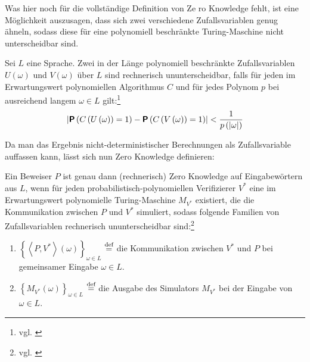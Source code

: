 Was hier noch für die vollständige Definition von Ze ro Knowledge fehlt, ist eine Möglichkeit auszusagen, dass sich zwei verschiedene Zufallsvariablen genug ähneln, sodass diese für eine polynomiell beschränkte Turing-Maschine nicht unterscheidbar sind.

\vspace{0.2cm}

\begin{definition} Sei \( L \) eine Sprache.
Zwei in der Länge polynomiell beschränkte Zufallsvariablen \( U \left( \omega \right) \) und \( V \left( \omega \right) \) über \( L \) sind rechnerisch ununterscheidbar, falls für jeden im Erwartungswert polynomiellen Algorithmus \( C \) und für jedes Polynom \( p \) bei ausreichend langem \( \omega \in L \) gilt:\footnote{vgl. \cite[Seite 93]{goldwasser1989}}
\[ \left| \textnormal{\textbf{\textsf{P}}} \left( C \left( U \left( \omega \right) \right) = 1 \right) - \textnormal{\textbf{\textsf{P}}} \left( C \left( V \left( \omega \right) \right) = 1 \right) \right| < \frac{1}{p \left( \left| \omega \right| \right)} \]
\end{definition}

Da man das Ergebnis nicht-deterministischer Berechnungen als Zufallsvariable auffassen kann, lässt sich nun Zero Knowledge definieren:

\vspace{0.2cm}

\begin{definition}
\label{definition:zeroknowledge}
Ein Beweiser \( P \) ist genau dann (rechnerisch) \textnormal{Zero Knowledge} auf Eingabewörtern aus \( L \), wenn für jeden probabilistisch-polynomiellen Verifizierer \( V ^ {\ast} \) eine im Erwartungswert polynomielle Turing-Maschine \( M_{V^{\ast}} \) existiert, die die Kommunikation zwischen \( P \) und \( V^{\ast} \) simuliert, sodass folgende Familien von Zufallsvariablen rechnerisch ununterscheidbar sind:\footnote{vgl. \cite[Definition 4]{20yearszeroknowledge}}
\begin{enumerate}
\item[1.] \( \left\lbrace \left< P, V^{\ast} \right> \left( \omega \right) \right\rbrace _{\omega \in L} \) \( \overset{\textnormal{def}}{=} \) die Kommunikation zwischen \( V ^ {\ast}\) und \( P \) bei gemeinsamer Eingabe \( \omega \in L \).
\item[2.] \( \left\lbrace M_{V^{\ast}} \left( \omega \right) \right\rbrace _{\omega \in L} \) \( \overset{\textnormal{def}}{=} \) die Ausgabe des Simulators \( M_{V^{\ast}} \) bei der Eingabe von \( \omega \in L \). 
\end{enumerate}
\end{definition}

\pagebreak
